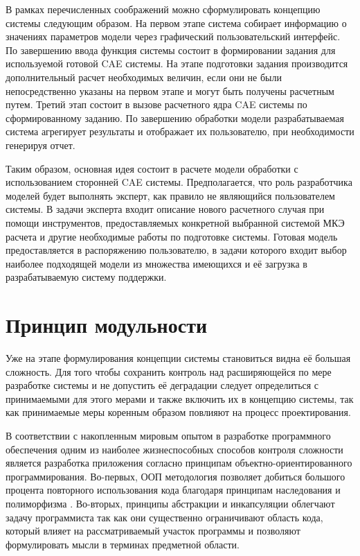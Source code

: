 \documentclass[14pt,oneside,final]{extreport}
\begin{document}
	В рамках перечисленных соображений можно сформулировать концепцию системы следующим образом. На первом этапе система собирает информацию о значениях параметров модели через графический пользовательский интерфейс. По завершению ввода функция системы состоит в формировании задания для используемой готовой CAE системы. На этапе подготовки задания производится дополнительный расчет необходимых величин, если они не были непосредственно указаны на первом этапе и могут быть получены расчетным путем. Третий этап состоит в вызове расчетного ядра CAE системы по сформированному заданию. По завершению обработки модели разрабатываемая система агрегирует результаты и отображает их пользователю, при необходимости генерируя отчет.

	Таким образом, основная идея состоит в расчете модели обработки с использованием сторонней CAE системы. Предполагается, что роль разработчика моделей будет выполнять эксперт, как правило не являющийся пользователем системы. В задачи эксперта входит описание нового расчетного случая при помощи инструментов, предоставляемых конкретной выбранной системой МКЭ расчета и другие необходимые работы по подготовке системы. Готовая модель предоставляется в распоряжению пользователю, в задачи которого входит выбор наиболее подходящей модели из множества имеющихся и её загрузка в разрабатываемую систему поддержки.

	\section{Принцип модульности}
	Уже на этапе формулирования концепции системы становиться видна её большая сложность. Для того чтобы сохранить контроль над расширяющейся по мере разработке системы и не допустить её деградации следует определиться с принимаемыми для этого мерами и также включить их в концепцию системы, так как принимаемые меры коренным образом повлияют на процесс проектирования. 
	
	В соответствии с накопленным мировым опытом в разработке программного обеспечения одним из наиболее жизнеспособных способов контроля сложности является разработка приложения согласно принципам  объектно-ориентированного программирования. Во-первых,  ООП методология позволяет добиться большого процента повторного использования кода благодаря принципам наследования и полиморфизма \cite{Shildt}. Во-вторых, принципы абстракции и инкапсуляции облегчают задачу программиста так как они существенно ограничивают область кода, который влияет на рассматриваемый участок программы и позволяют формулировать мысли в терминах предметной области. 
	
\end{document}
